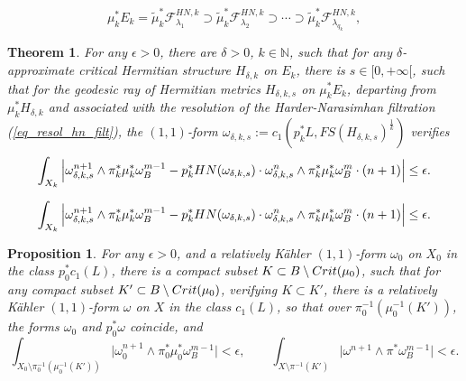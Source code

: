 \documentclass[10pt,a4paper]{amsart}
\newtheorem{thm}{Theorem}
\newtheorem{prop}{Proposition}
\newcommand{\nat}{\mathbb{N}}
\begin{document}
	\begin{equation}\label{eq_resol_hn_filt}
		\mu_k^* E_k = \tilde{\mu}_k^* \mathcal{F}^{HN, k}_{\lambda_1} \supset \tilde{\mu}_k^* \mathcal{F}^{HN, k}_{\lambda_2} \supset \cdots \supset \tilde{\mu}_k^* \mathcal{F}^{HN, k}_{\lambda_{q_k}},
	\end{equation}

	\begin{thm}\label{thm_expl_const1}
		For any $\epsilon > 0$, there are $\delta > 0$, $k \in \nat$, such that for any $\delta$-approximate critical Hermitian structure $H_{\delta, k}$ on $E_k$, there is $s \in [0, + \infty[$, such that for the geodesic ray of Hermitian metrics $H_{\delta, k, s}$ on $\mu_k^* E_k$, departing from $\mu_k^* H_{\delta, k}$ and associated with the resolution of the Harder-Narasimhan filtration (\ref{eq_resol_hn_filt}), the $(1, 1)$-form $\omega_{\delta, k, s} := c_1(p_k^* L, FS(H_{\delta, k, s})^{\frac{1}{k}})$ verifies
		\begin{equation}\label{eq_expl_const1}
			\int_{X_k}
			\Big|
			\omega_{\delta, k, s}^{n + 1} \wedge \pi_k^* \mu_k^* \omega_B^{m - 1}
			-
			p_k^* {\rm{HN}}(\omega_{\delta, k, s}) \cdot \omega_{\delta, k, s}^n \wedge  \pi_k^* \mu_k^* \omega_B^m \cdot (n + 1)
			\Big|
			\leq
			\epsilon.
		\end{equation}
	\end{thm}

		\begin{equation}
			\int_{X_k}
			\Big|
			\omega_{\delta, k, s}^{n + 1} \wedge \pi_k^* \mu_k^* \omega_B^{m - 1}
			-
			p_k^* {\rm{HN}}(\omega_{\delta, k, s}) \cdot \omega_{\delta, k, s}^n \wedge  \pi_k^* \mu_k^* \omega_B^m \cdot (n + 1)
			\Big|
			\leq
			\epsilon.
		\end{equation}

	\begin{prop}\label{prop_bir_mod}
		For any $\epsilon > 0$, and a relatively Kähler $(1, 1)$-form $\omega_0$ on $X_0$ in the class $p_0^* c_1(L)$, there is a compact subset $K \subset B \setminus {\rm{Crit}}(\mu_0)$, such that for any compact subset $K' \subset B \setminus {\rm{Crit}}(\mu_0)$, verifying $K \subset K'$, there is a relatively Kähler $(1, 1)$-form $\omega$ on $X$ in the class $c_1(L)$, so that over $\pi_0^{-1}(\mu_0^{-1}(K'))$, the forms $\omega_0$ and $p_0^* \omega$ coincide, and 
		\begin{equation}\label{eq_prop_bir_mod}
			\int_{X_0 \setminus \pi_0^{-1}(\mu_0^{-1}(K'))} \big| \omega_0^{n + 1} \wedge \pi_0^* \mu_0^* \omega_B^{m - 1} \big| < \epsilon, 
			\qquad 
			\int_{X \setminus \pi^{-1}(K')} \big| \omega^{n + 1} \wedge \pi^* \omega_B^{m - 1} \big| < \epsilon.
		\end{equation}
	\end{prop}
\end{document}
